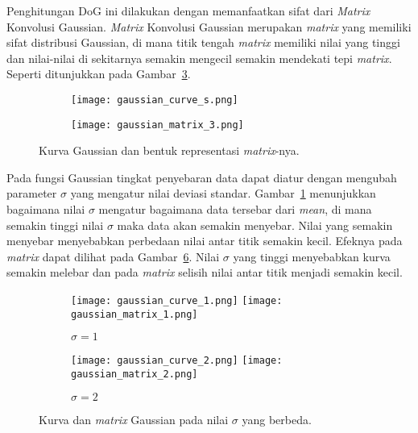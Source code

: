 Penghitungan DoG ini dilakukan dengan memanfaatkan sifat dari \textit{Matrix} Konvolusi Gaussian. \textit{Matrix} Konvolusi Gaussian merupakan \textit{matrix} yang memiliki sifat distribusi Gaussian, di mana titik tengah \textit{matrix} memiliki nilai yang tinggi dan nilai-nilai di sekitarnya semakin mengecil semakin mendekati tepi \textit{matrix}. Seperti ditunjukkan pada Gambar~\ref{fig:gaussian_function}. 

\begin{figure}[H]
	\begin{subfigure}[b]{.5\textwidth}
		\centering
		\texttt{[image: gaussian\_curve\_s.png]}
		\caption{}
		\label{subfig:gaussian_curve}
	\end{subfigure}%
	\begin{subfigure}[b]{.5\textwidth}
		\centering
		\texttt{[image: gaussian\_matrix\_3.png]}
		\caption{}
		\label{subfig:gaussian_matrix}
	\end{subfigure}
	\caption{Kurva Gaussian dan bentuk representasi \textit{matrix}-nya.}
	\label{fig:gaussian_function}
\end{figure}

Pada fungsi Gaussian tingkat penyebaran data dapat diatur dengan mengubah parameter $\sigma$ yang mengatur nilai deviasi standar. Gambar~\ref{subfig:gaussian_curve} menunjukkan bagaimana nilai $\sigma$ mengatur bagaimana data tersebar dari \textit{mean}, di mana semakin tinggi nilai $\sigma$ maka data akan semakin menyebar. Nilai yang semakin menyebar menyebabkan perbedaan nilai antar titik semakin kecil. Efeknya pada \textit{matrix} dapat dilihat pada Gambar~\ref{fig:gaussian_sigma}. Nilai $\sigma$ yang tinggi menyebabkan kurva semakin melebar dan pada \textit{matrix} selisih nilai antar titik menjadi semakin kecil.

\begin{figure}[H]
	\begin{subfigure}[b]{.5\textwidth}
		\centering
		\texttt{[image: gaussian\_curve\_1.png]}
		\texttt{[image: gaussian\_matrix\_1.png]}
		\caption{$\sigma=1$}
		\label{subfig:gaussian_sigma1}
	\end{subfigure}%
	\begin{subfigure}[b]{.5\textwidth}
		\centering
		\texttt{[image: gaussian\_curve\_2.png]}
		\texttt{[image: gaussian\_matrix\_2.png]}
		\caption{$\sigma=2$}
		\label{subfig:gaussian_sigma2}
	\end{subfigure}
	\caption{Kurva dan \textit{matrix} Gaussian pada nilai $\sigma$ yang berbeda.}
	\label{fig:gaussian_sigma}
\end{figure}

